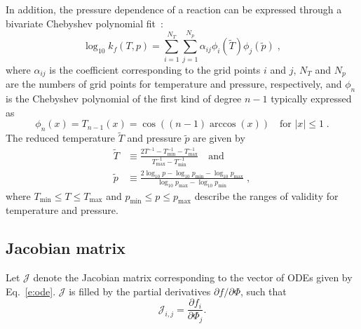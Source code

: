 \documentclass[preprint,12pt]{elsarticle}
\newcommand{ \dydx } [2] { \frac{ \partial #1 }{ \partial #2 } }
\begin{document}
In addition, the pressure dependence of a reaction can be expressed through a bivariate Chebyshev polynomial fit~\cite{Venkatesh:1997hv,Venkatesh:1997ik,Venkatesh:2000gj,chemkin:2012,Goodwin:2014aa}:
\begin{equation}
\log_{10} k_{f}(T, p) = \sum_{i = 1}^{N_T} \sum_{j = 1}^{N_p} \alpha_{ij} \phi_i (\tilde{T}) \phi_j \left(\tilde{p}\right) \label{e:cheb} \;,
\end{equation}
where $\alpha_{ij}$ is the coefficient corresponding to the grid points $i$ and $j$, $N_T$ and $N_p$ are the numbers of grid points for temperature and pressure, respectively, and $\phi_n$ is the Chebyshev polynomial of the first kind of degree $n - 1$ typically expressed as
\begin{equation}
\phi_n (x) = T_{n-1} (x) = \cos \left( (n - 1) \arccos (x) \right) \quad \text{for } |x| \leq 1 \;.
\end{equation}
The reduced temperature $\tilde{T}$ and pressure $\tilde{p}$ are given by 
\begin{align}
\tilde{T} &\equiv \frac{2 T^{-1} - T^{-1}_{\min} - T^{-1}_{\max}}{T^{-1}_{\max} - T^{-1}_{\min}} \quad\text{and} \\
\tilde{p} &\equiv \frac{2\log_{10} p - \log_{10} p_{\min} - \log_{10} p_{\max}}{\log_{10} p_{\max} - \log_{10} p_{\min}} \;,
\end{align}
where $T_{\min} \leq T \leq T_{\max}$ and $p_{\min} \leq p \leq p_{\max}$ describe the ranges of validity for temperature and pressure.


\subsection{Jacobian matrix}

Let $\mathcal{J}$ denote the Jacobian matrix corresponding to the vector of ODEs given by Eq.~\eqref{e:ode}. $\mathcal{J}$ is filled by the partial derivatives $\partial f / \partial \Phi$, such that
\begin{equation}
\mathcal{J}_{i,j} = \dydx{f_i}{\Phi_j} .
\end{equation}

\end{document}
